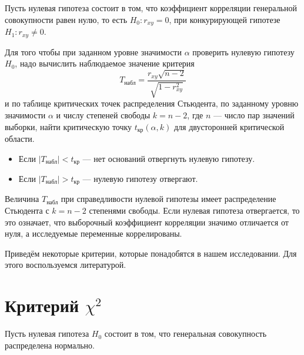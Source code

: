 Пусть нулевая гипотеза состоит в том, что коэффициент корреляции генеральной совокупности равен нулю, то есть $H_0: r_{xy} = 0$, при конкурирующей гипотезе $H_1: r_{xy} \ne 0$.

Для того чтобы при заданном уровне значимости $\alpha$ проверить нулевую гипотезу $H_0$, надо вычислить наблюдаемое значение критерия
\begin{equation*}
	T_{\textrm{набл}} = \frac{r_{xy}\sqrt{n-2}}{\sqrt{1-r_{xy}^{2}}}
\end{equation*}
и по таблице критических точек распределения Стьюдента, по заданному уровню значимости $\alpha$ и числу степеней свободы $k = n - 2$, где $n$ --- число пар значений выборки, найти критическую точку $t_{\textrm{кр}}(\alpha, k)$ для двусторонней критической области.
\begin{itemize}
	\item Если $\vert T_{\textrm{набл}} \vert < t_{\textrm{кр}}$ --- нет оснований отвергнуть нулевую гипотезу.
	\item Если $\vert T_{\textrm{набл}} \vert > t_{\textrm{кр}}$ --- нулевую гипотезу отвергают.
\end{itemize}

Величина $T_{\textrm{набл}}$ при справедливости нулевой гипотезы имеет распределение Стьюдента с $k = n - 2$ степенями свободы. Если нулевая гипотеза отвергается, то это означает, что выборочный коэффициент корреляции значимо отличается от нуля, а исследуемые переменные коррелированы.


Приведём некоторые критерии, которые понадобятся в нашем исследовании. Для этого воспользуемся литературой.

\section*{Критерий $\chi^2$} %
\label{sec:chisq}

Пусть нулевая гипотеза $H_0$ состоит в том, что генеральная совокупность распределена нормально.

